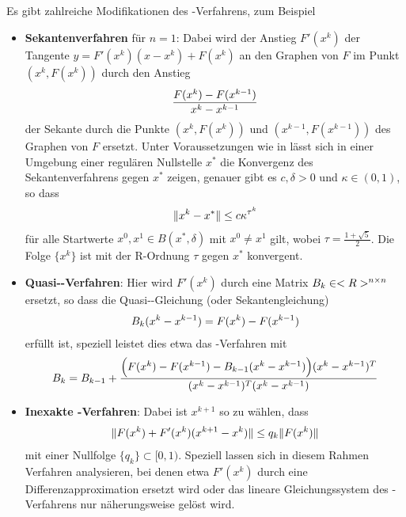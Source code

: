 \begin{remark}
	Es gibt zahlreiche Modifikationen des -Verfahrens, zum Beispiel
	\begin{itemize}
		\item\textbf{Sekantenverfahren} für $n=1$: Dabei wird der Anstieg $F'(x^k)$ der Tangente $y=F'(x^k)(x-x^k)+F(x^k)$ an den Graphen von $F$ im Punkt $(x^k,F(x^k))$ durch den Anstieg
		\begin{align}
			\frac{F(x^k) - F(x^{k-1})}{x^k-x^{k-1}}\notag
		\end{align}
		der Sekante durch die Punkte $(x^k,F(x^k))$ und $(x^{k-1},F(x^{k-1}))$ des Graphen von $F$ ersetzt. Unter Voraussetzungen wie in  lässt sich in einer Umgebung einer regulären Nullstelle $x^\ast$ die Konvergenz des Sekantenverfahrens gegen $x^\ast$ zeigen, genauer gibt es $c,\delta>0$ und $\kappa\in (0,1)$, so dass
		\begin{align}
			\Vert x^k-x^\ast\Vert \le c\kappa^{\tau^k}\notag
		\end{align}
		für alle Startwerte $x^0,x^1\in B(x^\ast,\delta)$ mit $x^0\neq x^1$ gilt, wobei $\tau = \frac{1+\sqrt{5}}{2}$. Die Folge $\{x^k\}$ ist mit der R-Ordnung $\tau$ gegen $x^\ast$ konvergent.
		\item\textbf{Quasi--Verfahren}: Hier wird $F'(x^k)$ durch eine Matrix $B_k\in<R>^{n\times n}$ ersetzt, so dass die Quasi--Gleichung (oder Sekantengleichung)
		\begin{align}
			B_k(x^k-x^{k-1}) = F(x^k) - F(x^{k-1})\notag
		\end{align}
		erfüllt ist, speziell leistet dies etwa das -Verfahren mit
		\begin{align}
			B_k= B_{k-1} + \frac{\Big(F(x^k) - F(x^{k-1}) - B_{k-1}(x^k - x^{k-1})\Big)(x^k - x^{k-1})^T}{(x^k - x^{k-1})^T(x^k - x^{k-1})} \notag
		\end{align}
		\item\textbf{Inexakte -Verfahren}: Dabei ist $x^{k+1}$ so zu wählen, dass
		\begin{align}
			\Vert F(x^k) + F'(x^k)(x^{k+1}-x^k)\Vert\le q_k\Vert F(x^k)\Vert\notag
		\end{align}
		mit einer Nullfolge $\{q_k\}\subset[0,1)$. Speziell lassen sich in diesem Rahmen Verfahren analysieren, bei denen etwa $F'(x ^k)$ durch eine Differenzapproximation ersetzt wird oder das lineare Gleichungssystem des -Verfahrens nur näherungsweise gelöst wird.
	\end{itemize}
\end{remark}
